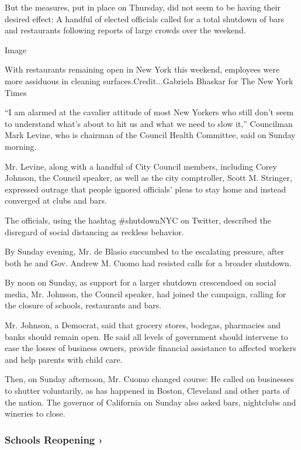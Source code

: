But the measures, put in place on Thursday, did not seem to be having
their desired effect: A handful of elected officials called for a total
shutdown of bars and restaurants following reports of large crowds over
the weekend.

Image

With restaurants remaining open in New York this weekend, employees were
more assiduous in cleaning surfaces.Credit...Gabriela Bhaskar for The
New York Times

``I am alarmed at the cavalier attitude of most New Yorkers who still
don't seem to understand what's about to hit us and what we need to slow
it,'' Councilman Mark Levine, who is chairman of the Council Health
Committee, said on Sunday morning.

Mr. Levine, along with a handful of City Council members, including
Corey Johnson, the Council speaker, as well as the city comptroller,
Scott M. Stringer, expressed outrage that people ignored officials'
pleas to stay home and instead converged at clubs and bars.

The officials, using the hashtag \#shutdownNYC on Twitter, described the
disregard of social distancing as reckless behavior.

By Sunday evening, Mr. de Blasio succumbed to the escalating pressure,
after both he and Gov. Andrew M. Cuomo had resisted calls for a broader
shutdown.

By noon on Sunday, as support for a larger shutdown crescendoed on
social media, Mr. Johnson, the Council speaker, had joined the campaign,
calling for the closure of schools, restaurants and bars.

Mr. Johnson, a Democrat, said that grocery stores, bodegas, pharmacies
and banks should remain open. He said all levels of government should
intervene to ease the losses of business owners, provide financial
assistance to affected workers and help parents with child care.

Then, on Sunday afternoon, Mr. Cuomo changed course: He called on
businesses to shutter voluntarily, as has happened in Boston, Cleveland
and other parts of the nation. The governor of California on Sunday also
asked bars, nightclubs and wineries to close.

\href{https://www.nytimes3xbfgragh.onion/spotlight/schools-reopening?action=click\&pgtype=Article\&state=default\&region=MAIN_CONTENT_3\&context=storylines_keepup}{}

\hypertarget{schools-reopening-}{%
\subsubsection{Schools Reopening ›}\label{schools-reopening-}}


